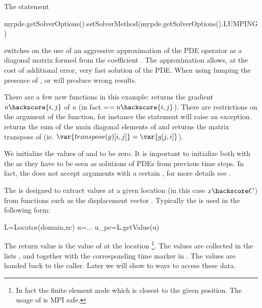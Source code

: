 The statement 
\begin{python}
mypde.getSolverOptions().setSolverMethod(mypde.getSolverOptions().LUMPING) 
\end{python}
switches on the use of an aggressive approximation of the PDE operator as a diagonal matrix
formed from the coefficient .
The approximation allows, at the cost of 
additional error, very fast 
solution of the PDE. When using lumping the presence of ,  or  will produce wrong results.
 
There are a few new \escript functions in this example: 
 returns the gradient $u\hackscore{i,j}$ of $u$ (in fact =$=u\hackscore{i,j}$).
There are restrictions on the argument of the  function, for instance
the statement  will raise an exception.
 returns the sum of the main diagonal elements  of  
and  returns the matrix transpose of  (ie. $\var{transpose(g)[i,j]}=\var{g[j,i]}$). 

We initialize the values of  and  to be zero. It is important
to initialize both with the \SolutionFS \FunctionSpace as they have to be seen as solutions of PDEs from previous time steps. In fact, the  does not accept arguments with a certain \FunctionSpace, for more details see . 

The  is designed to extract values at a given location (in this case $x\hackscore C$) from functions such as the displacement vector . Typically the  is used in the following form:  
\begin{python}
L=Locator(domain,xc)
u=...
u_pc=L.getValue(u)
\end{python}
The return value  is the value of  at the location \footnote{In fact the finite element node which is closest to the given position. The usage of   is MPI safe.}. The values
are collected in the lists ,  and  together with the 
corresponding time marker in . The values are handed back to the caller. Later we will show to ways to
access these data.

